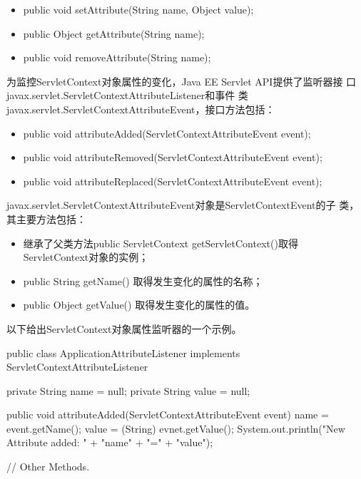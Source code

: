 \begin{itemize}
\item public void setAttribute(String name, Object value);
\item public Object getAttribute(String name);
\item public void removeAttribute(String name);
\end{itemize}

为监控ServletContext对象属性的变化，Java EE Servlet API提供了监听器接
口javax.servlet.ServletContextAttributeListener和事件
类javax.servlet.ServletContextAttributeEvent，接口方法包括：

\begin{itemize}\small
\item public void attributeAdded(ServletContextAttributeEvent event);
\item public void attributeRemoved(ServletContextAttributeEvent event);
\item public void attributeReplaced(ServletContextAttributeEvent event);
\end{itemize}


javax.servlet.ServletContextAttributeEvent对象是ServletContextEvent的子
类，其主要方法包括：

\begin{itemize}
\item 继承了父类方法public ServletContext getServletContext()取得
  ServletContext对象的实例；
\item public String getName() 取得发生变化的属性的名称；
\item public Object getValue() 取得发生变化的属性的值。
\end{itemize}

以下给出ServletContext对象属性监听器的一个示例。


\begin{javaCode}
  public class ApplicationAttributeListener implements
  ServletContextAttributeListener {
    private String name = null;
    private String value = null;
    
    public void attributeAdded(ServletContextAttributeEvent event) {
      name = event.getName();
      value = (String) evnet.getValue();
      System.out.println("New Attribute added: " + "name" + "=" + "value");
    }

    // Other Methods.

  }
\end{javaCode}

